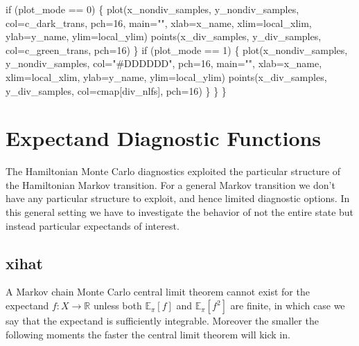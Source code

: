 \documentclass[
  letterpaper,
  DIV=11,
  numbers=noendperiod]{scrartcl}
\newenvironment{Shaded}{\begin{snugshade}}{\end{snugshade}}
\newcommand{\ControlFlowTok}[1]{\textcolor[rgb]{0.00,0.23,0.31}{#1}}
\newcommand{\DecValTok}[1]{\textcolor[rgb]{0.68,0.00,0.00}{#1}}
\newcommand{\NormalTok}[1]{\textcolor[rgb]{0.00,0.23,0.31}{#1}}
\newcommand{\OperatorTok}[1]{\textcolor[rgb]{0.37,0.37,0.37}{#1}}
\newcommand{\StringTok}[1]{\textcolor[rgb]{0.13,0.47,0.30}{#1}}
\begin{document}
\begin{Shaded}
\begin{Highlighting}[]
    \ControlFlowTok{if}\NormalTok{ (plot\_mode }\OperatorTok{==} \DecValTok{0}\NormalTok{) \{}
\NormalTok{      plot(x\_nondiv\_samples, y\_nondiv\_samples,}
\NormalTok{           col}\OperatorTok{=}\NormalTok{c\_dark\_trans, pch}\OperatorTok{=}\DecValTok{16}\NormalTok{, main}\OperatorTok{=}\StringTok{""}\NormalTok{,}
\NormalTok{           xlab}\OperatorTok{=}\NormalTok{x\_name, xlim}\OperatorTok{=}\NormalTok{local\_xlim, }
\NormalTok{           ylab}\OperatorTok{=}\NormalTok{y\_name, ylim}\OperatorTok{=}\NormalTok{local\_ylim)}
\NormalTok{      points(x\_div\_samples, y\_div\_samples,}
\NormalTok{             col}\OperatorTok{=}\NormalTok{c\_green\_trans, pch}\OperatorTok{=}\DecValTok{16}\NormalTok{)}
\NormalTok{    \}}
    \ControlFlowTok{if}\NormalTok{ (plot\_mode }\OperatorTok{==} \DecValTok{1}\NormalTok{) \{}
\NormalTok{      plot(x\_nondiv\_samples, y\_nondiv\_samples,}
\NormalTok{           col}\OperatorTok{=}\StringTok{"\#DDDDDD"}\NormalTok{, pch}\OperatorTok{=}\DecValTok{16}\NormalTok{, main}\OperatorTok{=}\StringTok{""}\NormalTok{,}
\NormalTok{           xlab}\OperatorTok{=}\NormalTok{x\_name, xlim}\OperatorTok{=}\NormalTok{local\_xlim, }
\NormalTok{           ylab}\OperatorTok{=}\NormalTok{y\_name, ylim}\OperatorTok{=}\NormalTok{local\_ylim)}
\NormalTok{      points(x\_div\_samples, y\_div\_samples,}
\NormalTok{             col}\OperatorTok{=}\NormalTok{cmap[div\_nlfs], pch}\OperatorTok{=}\DecValTok{16}\NormalTok{)}
\NormalTok{    \}}
\NormalTok{  \}}
\NormalTok{\}}
\end{Highlighting}
\end{Shaded}

\section{Expectand Diagnostic
Functions}\label{expectand-diagnostic-functions}

The Hamiltonian Monte Carlo diagnostics exploited the particular
structure of the Hamiltonian Markov transition. For a general Markov
transition we don't have any particular structure to exploit, and hence
limited diagnostic options. In this general setting we have to
investigate the behavior of not the entire state but instead particular
expectands of interest.

\subsection{xihat}\label{xihat}

A Markov chain Monte Carlo central limit theorem cannot exist for the
expectand \(f : X \rightarrow \mathbb{R}\) unless both
\(\mathbb{E}_{\pi}[f]\) and \(\mathbb{E}_{\pi}[f^{2}]\) are finite, in
which case we say that the expectand is sufficiently integrable.
Moreover the smaller the following moments the faster the central limit
theorem will kick in.
\end{document}
